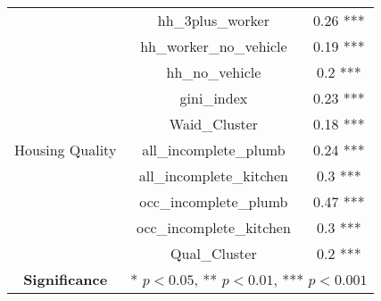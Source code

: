 \begin{longtable}{|c|c|c|}
     & hh\_3plus\_worker & 0.26 *** \\ 
     & hh\_worker\_no\_vehicle & 0.19 *** \\ 
     & hh\_no\_vehicle & 0.2 *** \\ 
     & gini\_index & 0.23 *** \\ 
     & Waid\_Cluster & 0.18 *** \\ 
    Housing Quality & all\_incomplete\_plumb & 0.24 *** \\ 
     & all\_incomplete\_kitchen & 0.3 *** \\ 
     & occ\_incomplete\_plumb & 0.47 *** \\ 
     & occ\_incomplete\_kitchen & 0.3 *** \\ 
     & Qual\_Cluster & 0.2 *** \\ 
       \hline
    \textbf{Significance} & \multicolumn{2}{c|}{* $p < 0.05$, ** $p < 0.01$, *** $p < 0.001$} \\
\end{longtable}
